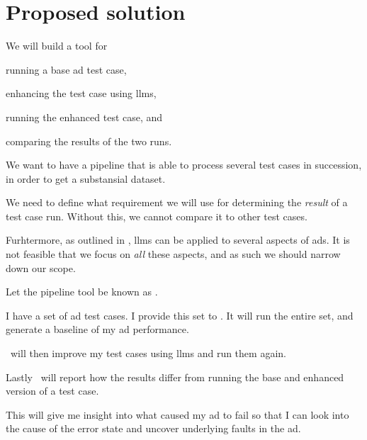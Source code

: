 \section{Proposed solution}\label{sec:solutionProposal}

We will build a tool for
\begin{inparaenum}
    \item running a base \acrshort{ad} test case,
    \item enhancing the test case using \acrshort{llms},
    \item running the enhanced test case,
    and
    \item comparing the results of the two runs.
\end{inparaenum}

We want to have a pipeline that is able to process several test cases in succession, in order to get
a substansial dataset.

We need to define what requirement we will use for determining the \textit{result} of a test case
run. Without this, we cannot compare it to other test cases.

Furhtermore, as outlined in \citeauthor{LLM4AD}, \acrlong{llms} can be applied to several aspects
of \acrlong{ads}. It is not feasible that we focus on \textit{all} these aspects, and as such we
should narrow down our scope.



Let the pipeline tool be known as \hefe.


\begin{tcolorbox}[colback=gray!5!white,colframe=gray!75!black,title=User history
of using \hefe]\label{user-history}
    I have a set of \acrfull{ad} test cases. I provide this set to \hefe. It will run the entire
    set, and generate a baseline of my \acrshort{ad} performance.

    \hefe~will then improve my test cases using \acrlong{llms} and run them again.

    Lastly \hefe~will report how the results differ from running the base and enhanced version of a
    test case.

    This will give me insight into what caused my \acrshort{ad} to fail so that I can look into the
    cause of the error state and uncover underlying faults in the \acrlong{ad}.

\end{tcolorbox}


